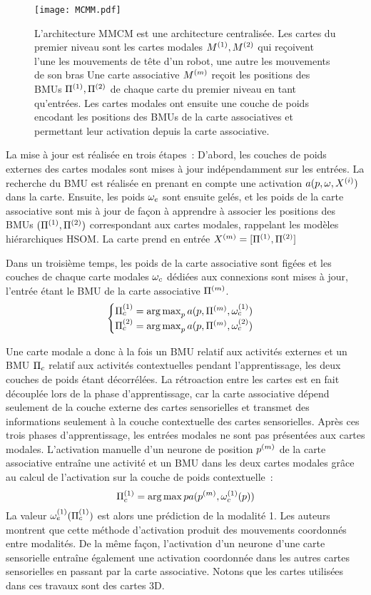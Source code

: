 \documentclass[../main]{subfiles}
\begin{document}
\begin{figure}[t]
    \centering
    \texttt{[image: MCMM.pdf]}
    \caption{L'architecture MMCM \parencite{dominey13} est une architecture centralisée.
    Les cartes du premier niveau sont les cartes modales $M^{({1})}, M^{({2})}$ qui reçoivent l'une les mouvements de tête d'un robot, une autre les mouvements de son bras
    Une carte associative $M^{({m})}$ reçoit les positions des BMUs $\Pi^{({1})},\Pi^{({2})}$ de chaque carte du premier niveau en tant qu'entrées. 
    Les cartes modales ont ensuite une couche de poids encodant les positions des BMUs de la carte associatives et permettant leur activation depuis la carte associative.
    \label{fig:mmcm}}
\end{figure}

La mise à jour est réalisée en trois étapes~: 
D'abord, les couches de poids externes des cartes modales sont mises à jour indépendamment sur les entrées. La recherche du BMU est réalisée en prenant en compte une activation $a(p, \omega, X^{({i})})$ dans la carte.
Ensuite, les poids $\omega_e$ sont ensuite gelés, et les poids de la carte associative sont mis à jour de façon à apprendre à associer les positions des BMUs $(\Pi^{({1})},\Pi^{({2})})$ correspondant aux cartes modales, rappelant les modèles hiérarchiques HSOM. La carte prend en entrée $X^{({m})} = [\Pi^{({1})}, \Pi^{({2})}]$

Dans un troisième temps, les poids de la carte associative sont figées et les couches de chaque carte modales $\omega_c$ dédiées aux connexions sont mises à jour, l'entrée étant le BMU de la carte associative $\Pi^{({m})}$.
\begin{equation*}
    \begin{cases}
        \Pi_c^{({1})} = \operatorname*{arg\,max}_p a(p, \Pi^{({m})}, \omega_c^{({1})})\\
        \Pi_c^{({2})} = \operatorname*{arg\,max}_p a(p, \Pi^{({m})}, \omega_c^{({2})})
    \end{cases}
    \end{equation*}

Une carte modale a donc à la fois un BMU relatif aux activités externes et un BMU $\Pi_c$ relatif aux activités contextuelles pendant l'apprentissage, les deux couches de poids étant décorrélées.
La rétroaction entre les cartes est en fait découplée lors de la phase d'apprentissage, car la carte associative dépend seulement de la couche externe des cartes sensorielles et transmet des informations seulement à la couche contextuelle des cartes sensorielles.
Après ces trois phases d'apprentissage, les entrées modales ne sont pas présentées aux cartes modales. L'activation manuelle d'un neurone de position $p^{({m})}$ de la carte associative entraîne une activité et un BMU dans les deux cartes modales grâce au calcul de l'activation sur la couche de poids contextuelle~: 
$$ \Pi_c^{({1})} = \operatorname*{arg\,max}\limits p a(p^{({m})},\omega_c^{({1})}(p))$$
La valeur $\omega_e^{({1})}(\Pi_c^{({1})})$ est alors une prédiction de la modalité 1.
Les auteurs montrent que cette méthode d'activation produit des mouvements coordonnés entre modalités.
De la même façon, l'activation d'un neurone d'une carte sensorielle entraîne également une activation coordonnée dans les autres cartes sensorielles en passant par la carte associative.
Notons que les cartes utilisées dans ces travaux sont des cartes 3D.
\end{document}

